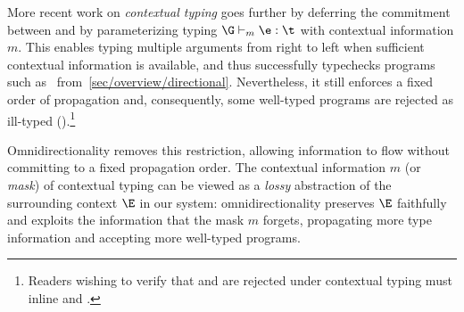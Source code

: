 \documentclass[acmsmall,screen,nonacm%
\Anonymous{,anonymous}{}%
\Final{}{,review}%
]{acmart}
\begin{document}

More recent work on \emph{contextual typing} \citep{journals/pacmpl/XueO24, journals/pacmpl/XueCJO26}
goes further by deferring the commitment between 
and  by parameterizing typing $\G \th_m \e : \t$ 
with contextual information $m$.
%
This enables typing multiple arguments from right to left when sufficient
contextual information is available, and thus successfully typechecks
programs such as~
from~\cref{sec/overview/directional}. Nevertheless, it still enforces a
fixed order of propagation and, consequently, some well-typed programs are
rejected as ill-typed (\eg {}).\footnote{\let \code
\Code%
%
Readers wishing to verify
that \code{ex_6_2} and \code{ex_6_3} are rejected under contextual typing must
inline \code{app} and \code{rev_app}. }

%
%
%
%
%


Omnidirectionality removes this restriction, allowing information to flow
without committing to a fixed propagation order. The contextual information $m$
(or \emph{mask}) of contextual typing can be viewed as a \emph{lossy}
abstraction of the surrounding context $\E$ in our system: omnidirectionality
preserves $\E$ faithfully and exploits the information that the
mask $m$ forgets, propagating more type information and accepting more
well-typed programs. 
\end{document}
